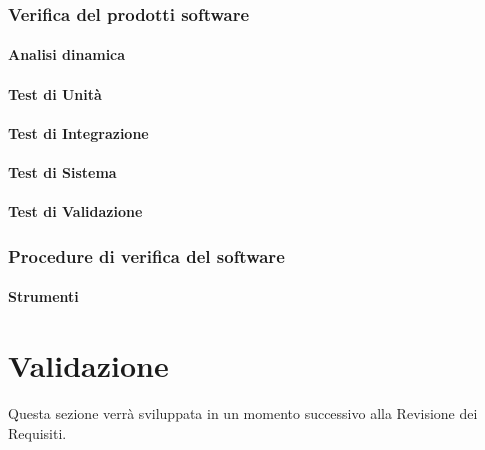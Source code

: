 \subsubsection{Verifica del prodotti software}
\paragraph{Analisi dinamica}
\paragraph{Test di Unità}
\paragraph{Test di Integrazione}
\paragraph{Test di Sistema}
\paragraph{Test di Validazione}
\subsubsection{Procedure di verifica del software}
\paragraph{Strumenti}
\section{Validazione}
Questa sezione verrà sviluppata in un momento successivo alla Revisione dei Requisiti.


